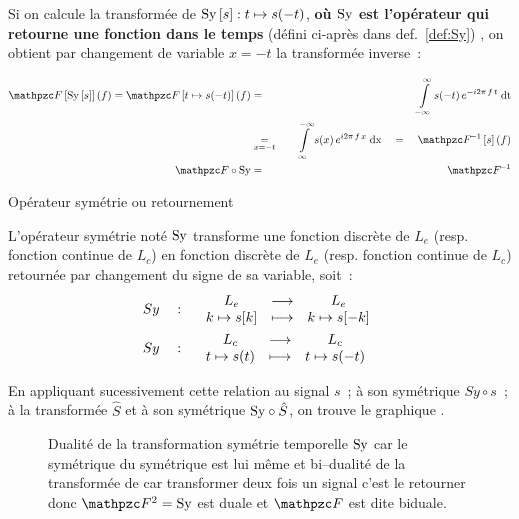 Si on calcule la transformée de $\mathrm{Sy}\left[s\right] : t\mapsto s(-t)$,
\textbf{où $\mathrm{Sy}{}$ est l'opérateur qui retourne une fonction dans le
  temps} (défini ci-après dans def.~\ref{def:Sy}) , on obtient par
changement de variable $x=-t$ la transformée inverse~:

\begin{eqnarray}
  \label{eq:Transformee_de_Sy}
  \F\b{\Sy\b{s}}(f)=\F\b{t\mapsto s(-t)}(f)&=&\quad\intDt{-\infty}{\infty}{s(-t)\,e^{-i2\pi\,f\,t}} \nonumber\\
                                           & \underset{x=-t}{=}& \quad\intDx{\infty}{-\infty}{s(x)\,e^{i2\pi\,f\,x}}\quad =\quad \Finv\b{s}(f) \nonumber\\
  \F\circ\Sy &=& \quad \Finv
\end{eqnarray}

\begin{definition}{Opérateur symétrie ou \og{} retournement \fg{}}
  \label{def:Sy}
  
  L'opérateur symétrie noté $\mathrm{Sy}$ transforme une fonction discrète de
  $L_e$ (resp. fonction continue de $L_c$) en fonction discrète de
  $L_e$ (resp. fonction continue de $L_c$) retournée par changement du
  signe de sa variable, soit~:
  \begin{align}
    \label{eq:Sy}
    &Sy\quad:\quad\begin{array}{ccc} L_e & \longrightarrow & L_e \\ k \mapsto s\!\left[k\right] & \longmapsto & k \mapsto s\!\left[-k\right] \\ \end{array}\\
    &Sy\quad:\quad\begin{array}{ccc} L_c & \longrightarrow & L_c \\ t \mapsto s\!\left(t\right) & \longmapsto & t \mapsto s\!\left(-t\right) \\ \end{array}\nonumber
  \end{align}
\end{definition}

En appliquant sucessivement cette relation au signal $s$~; à son
symétrique $Sy\circ s$~; à la transformée $\hat{S}$ et à son
symétrique $\mathrm{Sy}\circ\hat{S}$, on trouve le graphique
.
\begin{figure}[ht!]
  \centering {}
  \caption{Dualité de la transformation symétrie temporelle $\mathrm{Sy}$ car
    le symétrique du symétrique est lui même et bi--dualité de la
    transformée de \Fourier{} car transformer deux fois un signal
    c'est le retourner donc $\F{}^2=\Sy{}$ est duale et $\F{}$ est
    dite biduale.}
  \label{fig:dualite_4_f}
\end{figure}

